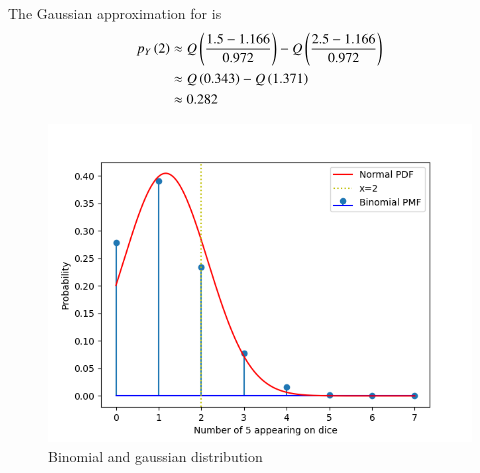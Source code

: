 \documentclass[journal,12pt,onecolumn]{IEEEtran}
\theoremstyle{remark}
\begin{document}
\begin{enumerate}
	The Gaussian approximation for  is
	\begin{align}
		p_Y\left(2\right)&\approx Q\left(\frac{1.5 - 1.166}{0.972}\right) -Q\left(\frac{2.5 -1.166}{0.972}\right)\\
	&\approx Q\left(0.343\right) - Q\left(1.371\right)\\
	&\approx 0.282
	\end{align}
\begin{figure}[ht!]
	\centering
	\includegraphics[width=\columnwidth]{ncert/9/3/13/figs/figure.png}
	\caption{Binomial and gaussian distribution}
	\label{fig:gauss9.3.3}
\end{figure}
\end{enumerate}
\end{document}
